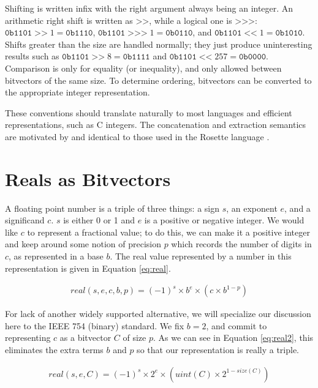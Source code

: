 \documentclass[letterpaper,10pt]{article}
\begin{document}
Shifting is written infix with the right argument always being an integer. An arithmetic right shift is written as $\texttt{>>}$, while a logical one is $\texttt{>>>}$: $\texttt{0b1101} \;\texttt{>>}\; 1 = \texttt{0b1110}$, $\texttt{0b1101} \;\texttt{>>>}\; 1 = \texttt{0b0110}$, and $\texttt{0b1101} \;\texttt{<<}\; 1 = \texttt{0b1010}$. Shifts greater than the size are handled normally; they just produce uninteresting results such as $\texttt{0b1101} \;\texttt{>>}\; 8 = \texttt{0b1111}$ and $\texttt{0b1101} \;\texttt{<<}\; 257 = \texttt{0b0000}$. Comparison is only for equality (or inequality), and only allowed between bitvectors of the same size. To determine ordering, bitvectors can be converted to the appropriate integer representation.

These conventions should translate naturally to most languages and efficient representations, such as C integers. The concatenation and extraction semantics are motivated by and identical to those used in the Rosette language \cite{rosette}.

\section{Reals as Bitvectors}

A floating point number is a triple of three things: a sign $s$, an exponent $e$, and a significand $c$. $s$ is either 0 or 1 and $e$ is a positive or negative integer. We would like $c$ to represent a fractional value; to do this, we can make it a positive integer and keep around some notion of precision $p$ which records the number of digits in $c$, as represented in a base $b$. The real value represented by a number in this representation is given in Equation \ref{eq:real}.

\begin{align} \label{eq:real}
 real(s, e, c, b, p) = (-1)^s \times b^e \times (c \times b^{1 - p})
\end{align}

For lack of another widely supported alternative, we will specialize our discussion here to the IEEE 754 (binary) standard. We fix $b = 2$, and commit to representing $c$ as a bitvector $C$ of size $p$. As we can see in Equation \ref{eq:real2}, this eliminates the extra terms $b$ and $p$ so that our representation is really a triple.

\begin{align} \label{eq:real2}
 real(s, e, C) = (-1)^s \times 2^e \times (uint(C) \times 2^{1 - size(C)})
\end{align}
\end{document}
